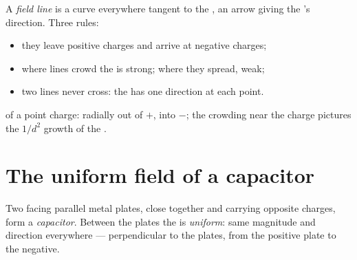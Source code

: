\begin{definition}\label{def:g11:electric-gravitational-fields:lines}
A \emph{field line} is a curve everywhere tangent to
the , an arrow giving the 's direction. Three rules:
\begin{itemize}
  \item they leave positive charges and arrive at negative charges;
  \item where lines crowd the  is strong; where they spread, weak;
  \item two lines never cross: the  has one direction at each point.
\end{itemize}
\end{definition}

\begin{omfigure}
\qquad\qquad
{}

{\small {} of a point charge: radially out of $+$, into $-$;
the crowding near the charge pictures the $1/d^2$ growth of the .}
\end{omfigure}

\section{The uniform field of a capacitor}

\begin{definition}\label{def:g11:electric-gravitational-fields:capacitor}
Two facing parallel metal plates, close together and carrying opposite
charges, form a \emph{capacitor}. Between the plates
the  is \emph{uniform}: same magnitude and
direction everywhere --- perpendicular to the plates, from the positive
plate to the negative.
\end{definition}

